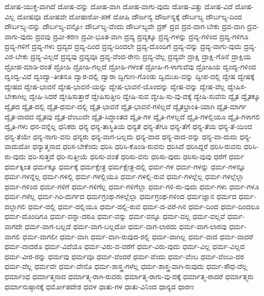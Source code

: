 {ದೋಷ-ಯುಕ್ತ-ವಾಗಿದೆ
ದೋಷ-ವನ್ನು
ದೋಷ-ವಾಗಿ
ದೋಷ-ವಾಗು-ವುದು
ದೋಷ-ವಿತ್ತು
ದೋಷ-ವಿದೆ
ದೋಷ-ವಿಲ್ಲ
ದೋಷವೂ
ದೋಷವೇ
ದೋಷಾರೋ-ಪಣೆ
ದೋಷಿ
ದೌರ್ಜನ್ಯ
ದೌರ್ಜನ್ಯಕ್ಕೆ
ದೌರ್ಬಲ್ಯ
ದೌರ್ಬಲ್ಯ-ದಿಂದ
ದೌರ್ಬಲ್ಯ-ವನ್ನು
ದೌರ್ಬಲ್ಯ-ವನ್ನೋ
ದೌರ್ಬಲ್ಯ-ವೆಂದು
ದೌರ್ಬಲ್ಯವೇ
ದ್ರಕ್
ದ್ರವ
ದ್ರವ-ವಾಗ-ಬೇಕು
ದ್ರವ-ವಾಗಿ
ದ್ರವ-ವಾಗು-ವುದು
ದ್ರವವು
ದ್ರವೀ-ಕರಣ
ದ್ರವೀ-ಭೂತ-ವಾಗಿ
ದ್ರವ್ಯ
ದ್ರವ್ಯಕ್ಕೂ
ದ್ರವ್ಯ-ಗಳನ್ನು
ದ್ರವ್ಯ-ಗಳಿಂದ
ದ್ರವ್ಯ-ಗಳಿಗೂ
ದ್ರವ್ಯ-ಗಳಿಗೆ
ದ್ರವ್ಯ-ಗಳು
ದ್ರವ್ಯದ
ದ್ರವ್ಯ-ದಿಂದ
ದ್ರವ್ಯ-ದಿಂದಲೇ
ದ್ರವ್ಯ-ದೊಂದಿಗೆ
ದ್ರವ್ಯ-ವನ್ನು
ದ್ರವ್ಯ-ವಾಗು-ವುದು
ದ್ರವ್ಯ-ವಿರ-ಬೇಕು
ದ್ರವ್ಯ-ವಿಲ್ಲದೆ
ದ್ರವ್ಯವು
ದ್ರವ್ಯವೂ
ದ್ರವ್ಯ-ವೆಂದ-ರೇನು
ದ್ರವ್ಯ-ವೆಲ್ಲ
ದ್ರವ್ಯವೇ
ದ್ರಾಕ್ಷಿ
ದ್ರಾಕ್ಷಿ-ಗೊನೆ
ದ್ರಾಕ್ಷಿಯ
ದ್ರೋಹ-ಮಾಡಿ-ದಂತೆ
ದ್ರೋಹಿ
ದ್ರೋಹಿ-ಗಲ್ಲದೆ
ದ್ರೋಹಿ-ಗಳಂತೆ
ದ್ರೋಹಿ-ಗ-ಳಾಗುವೆವು
ದ್ರೋಹಿಯ
ದ್ವಂದ್ವ-ಗಳಿಂದ
ದ್ವಂದ್ವ-ವಿದೆ
ದ್ವಂದ್ವಾ-ತೀತನೂ
ದ್ವಾರ-ದಲ್ಲಿ
ದ್ವಾರಾ
ದ್ವಿಗುಣ-ಗೊಂಡು
ದ್ವಿಮುಖ-ವನ್ನು
ದ್ವೀಪ-ದಲ್ಲಿ
ದ್ವೇಷ
ದ್ವೇಷಕ್ಕೆ
ದ್ವೇಷದ
ದ್ವೇಷ-ಭಾವನೆ
ದ್ವೇಷ-ಭಾವನೆ-ಯನ್ನು
ದ್ವೇಷ-ಭಾವನೆ-ಯೊಂದನ್ನು
ದ್ವೇಷ-ವನ್ನು
ದ್ವೇಷ-ವೆಲ್ಲ
ದ್ವೇಷಿಸ-ಬೇಕಾಗಿಲ್ಲ
ದ್ವೇಷಿ-ಸಿದರೆ
ದ್ವೇಷಿಸುತ್ತಾರೆ
ದ್ವೇಷಿಸುತ್ತೀರಿ
ದ್ವೇಷಿ-ಸುವ
ದ್ವೇಷಿ-ಸು-ವು-ದಕ್ಕೆ
ದ್ವೇಷಿ-ಸುವೆನು
ದ್ವೈತ
ದ್ವೈತಕ್ಕೂ
ದ್ವೈತದ
ದ್ವೈತ-ದಲ್ಲಿ
ದ್ವೈತ-ಧರ್ಮ-ದಲ್ಲಿ
ದ್ವೈತ-ಭಾವನೆ
ದ್ವೈತ-ಭಾವನೆ-ಗಳಿಲ್ಲದೆ
ದ್ವೈತಭ್ರಾಂತಿ-ಯಾಗಿ
ದ್ವೈತ-ಮಾರ್ಗ
ದ್ವೈತ-ವಾದದ
ದ್ವೈತವು
ದ್ವೈತ-ವೆಂಬುದೇ
ದ್ವೈತ-ಸಿದ್ಧಾಂತದ
ದ್ವೈತಿ-ಗಳ
ದ್ವೈತಿ-ಗಳಲ್ಲದೆ
ದ್ವೈತಿ-ಗಳಲ್ಲಿಯೂ
ದ್ವೈತಿ-ಗಳಾಗಲಿ
ದ್ವೈತಿ-ಗಳು
ಧನ-ವನ್ನೆಲ್ಲ
ಧನಿಕರು
ಧನ್ಯ
ಧನ್ಯ-ತಾಸ್ಥಿತಿಯ
ಧನ್ಯತೆ
ಧನ್ಯ-ತೆಗೂ
ಧನ್ಯ-ತೆಗೆ
ಧನ್ಯ-ತೆಯ
ಧನ್ಯ-ತೆ-ಯಿಂದ
ಧನ್ಯ-ತೆಯೇ
ಧನ್ಯ-ನಾಗು-ವನು
ಧನ್ಯರು
ಧನ್ಯ-ವಾಗ-ಬಲ್ಲದು
ಧನ್ಯ-ವಾದ
ಧನ್ಯ-ವಾದ-ವನ್ನು
ಧನ್ಯ-ವಾ-ದುದು
ಧನ್ಯ-ವಾದುದೋ
ಧನ್ಯಾತ್ಮನಾದ
ಧರಿಸ-ಬೇಕೆಂದು
ಧರಿಸಿ
ಧರಿಸಿ-ಕೊಂಡಿ-ರುವನು
ಧರಿಸಿದೆ
ಧರಿಸಿದ್ದರೆ
ಧರಿಸಿ-ರುವನು
ಧರಿಸಿ-ರು-ವುದು
ಧರಿ-ಸುತ್ತದೆ
ಧರಿ-ಸುತ್ತೀಯೆ
ಧರಿಸು-ವಂತೆ
ಧರಿಸು-ವನು
ಧರಿಸು-ವುದು
ಧರಿಸು-ವುವು
ಧರೆಗೆ
ಧರ್ಮ
ಧರ್ಮಕ್ಕಿಂತ
ಧರ್ಮಕ್ಕೂ
ಧರ್ಮಕ್ಕೆ
ಧರ್ಮಕ್ಷೇತ್ರ
ಧರ್ಮಕ್ಷೇತ್ರ-ದಲ್ಲಿ
ಧರ್ಮ-ಗಳ
ಧರ್ಮ-ಗಳನ್ನು
ಧರ್ಮ-ಗಳನ್ನೂ
ಧರ್ಮ-ಗಳನ್ನೆಲ್ಲ
ಧರ್ಮ-ಗಳಲ್ಲಿ
ಧರ್ಮ-ಗಳಲ್ಲಿಯೂ
ಧರ್ಮ-ಗಳಲ್ಲಿ-ರುವ
ಧರ್ಮ-ಗಳಲ್ಲೆಲ್ಲ
ಧರ್ಮ-ಗಳಲ್ಲೆಲ್ಲಾ
ಧರ್ಮ-ಗಳಿಂದ
ಧರ್ಮ-ಗಳಿಗೆ
ಧರ್ಮ-ಗಳಿಗೆಲ್ಲ
ಧರ್ಮ-ಗಳಿಗೆಲ್ಲಾ
ಧರ್ಮ-ಗಳಿ-ರು-ವುದು
ಧರ್ಮ-ಗಳು
ಧರ್ಮ-ಗಳೂ
ಧರ್ಮ-ಗಳೆಲ್ಲ
ಧರ್ಮ-ಗಿರಿ-ದುರ್ಗದ
ಧರ್ಮಗ್ರಂಥ-ಗಳಲ್ಲೆಲ್ಲಾ
ಧರ್ಮಗ್ರಂಥ-ಗಳಿಂದ
ಧರ್ಮಜ್ಞಾನ
ಧರ್ಮದ
ಧರ್ಮ-ದಲ್ಲಾಗಲಿ
ಧರ್ಮ-ದಲ್ಲಿ
ಧರ್ಮ-ದಲ್ಲಿಯೂ
ಧರ್ಮ-ದಲ್ಲಿ-ರುವ
ಧರ್ಮ-ದ-ವರೆ-ಗಿನ
ಧರ್ಮ-ದಿಂದ
ಧರ್ಮ-ದಿಂದಲೂ
ಧರ್ಮ-ದೊಂದಿಗೂ
ಧರ್ಮ-ವನ್ನಾ-ದರೂ
ಧರ್ಮ-ವನ್ನು
ಧರ್ಮ-ವನ್ನೂ
ಧರ್ಮ-ವಲ್ಲ
ಧರ್ಮ-ವಲ್ಲವೆ
ಧರ್ಮ-ವಾಗದೇ
ಧರ್ಮ-ವಾಗ-ಬಲ್ಲದೆ
ಧರ್ಮ-ವಾಗ-ಬಲ್ಲದೋ
ಧರ್ಮ-ವಾಗ-ಲಾರದು
ಧರ್ಮ-ವಾಗ-ಲಾರವು
ಧರ್ಮ-ವಾಗಲಿ
ಧರ್ಮ-ವಾಗಲೀ
ಧರ್ಮ-ವಾಗಿ
ಧರ್ಮ-ವಾಗಿ-ರುವುದ-ರಲ್ಲಿ
ಧರ್ಮ-ವಾಗಿಲ್ಲ
ಧರ್ಮ-ವಾದ
ಧರ್ಮ-ವಾದರೆ
ಧರ್ಮ-ವಾದರೊ
ಧರ್ಮ-ವಿದೆಯೊ
ಧರ್ಮ-ವಿರು-ವ-ವರೆಗೆ
ಧರ್ಮ-ವಿರು-ವುದು
ಧರ್ಮ-ವಿಲ್ಲ
ಧರ್ಮ-ವಿಲ್ಲದ
ಧರ್ಮ-ವೀರ-ರನ್ನು
ಧರ್ಮವು
ಧರ್ಮವೂ
ಧರ್ಮ-ವೆಂದರೆ
ಧರ್ಮ-ವೆಂದು
ಧರ್ಮ-ವೆಂಬ
ಧರ್ಮ-ವೆಂಬು-ದರ
ಧರ್ಮ-ವೆಲ್ಲ
ಧರ್ಮವೇ
ಧರ್ಮ-ವೇನೊ
ಧರ್ಮ-ಶಾಸ್ತ್ರ-ಗಳೆಲ್ಲ
ಧರ್ಮ-ಶಾಸ್ತ್ರ-ವಾಗಿ-ರುವುದು
ಧರ್ಮ-ಸೌಧ-ವೆಲ್ಲ
ಧರ್ಮಾಂಧ
ಧರ್ಮಾತ್ಮನಾದ
ಧರ್ಮಾತ್ಮ-ರಾಗಿ-ರುವರು
ಧರ್ಮಾತ್ಮ-ರಾಗು-ವು-ದಕ್ಕೆ
ಧರ್ಮಾತ್ಮ-ರಾದರೆ
ಧರ್ಮಾತ್ಮರು
ಧರ್ಮಾನುಷ್ಠಾನಕ್ಕೆ
ಧರ್ಮೋಪದೇಶ
ಧವಳ
ಧಾತು-ಗಳ
ಧಾತು-ವಿನಿಂದ
ಧಾನ್ಯದ
ಧಾರಣ
}
